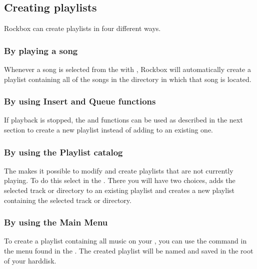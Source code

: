 \subsection{Creating playlists}

Rockbox can create playlists in four different ways.

\subsubsection{By playing a song}
Whenever a song is selected from the  with
\ActionTreeEnter, Rockbox will automatically create a playlist containing
all of the songs in the directory in which that song is located.


\subsubsection{By using Insert and Queue functions}
If playback is stopped, the  and  functions
can be used as described in the next section to create a new playlist instead
of adding to an existing one.

\subsubsection{By using the Playlist catalog}
The  makes it possible to modify and create playlists
that are not currently playing. To do this select 
in the . There you will have two choices,
 adds the selected track or directory to an existing
playlist and  creates a new playlist containing
the selected track or directory.


\subsubsection{By using the Main Menu}
To create a playlist containing all music on your \dap{}, you can use the
 command in the  menu found
in the . The created playlist will be named
 and saved in the root of your \daps{} harddisk.

